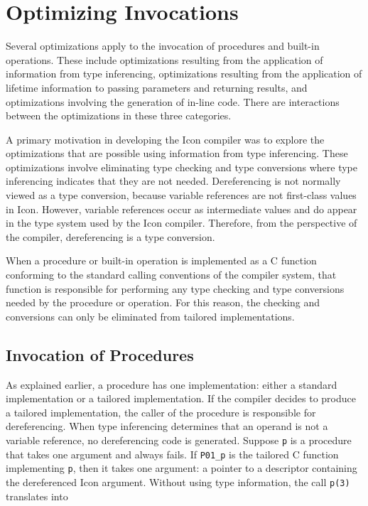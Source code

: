 \chapter{Optimizing Invocations}

Several optimizations apply to the invocation of procedures and
built-in operations. These include optimizations resulting from the
application of information from type inferencing, optimizations
resulting from the application of lifetime information to passing
parameters and returning results, and optimizations involving the
generation of in-line code. There are interactions between the
optimizations in these three categories.

A primary motivation in developing the Icon compiler was to explore
the optimizations that are possible using information from type
inferencing. These optimizations involve eliminating type checking and
type conversions where type inferencing indicates that they are not
needed. Dereferencing is not normally viewed as a type conversion,
because variable references are not first-class values in
Icon. However, variable references occur as intermediate values and do
appear in the type system used by the Icon compiler. Therefore, from
the perspective of the compiler, dereferencing is a type conversion.

When a procedure or built-in operation is implemented as a C function
conforming to the standard calling conventions of the compiler system,
that function is responsible for performing any type checking and type
conversions needed by the procedure or operation. For this reason, the
checking and conversions can only be eliminated from tailored
implementations.


\section{Invocation of Procedures}

As explained earlier, a procedure has one implementation: either a
standard implementation or a tailored implementation.  If the compiler
decides to produce a tailored implementation, the caller of the
procedure is responsible for dereferencing. When type inferencing
determines that an operand is not a variable reference, no
dereferencing code is generated. Suppose \texttt{p} is a procedure
that takes one argument and always fails. If \texttt{P01\_p} is the
tailored C function implementing \texttt{p}, then it takes one
argument: a pointer to a descriptor containing the dereferenced Icon
argument.  Without using type information, the call \texttt{p(3)}
translates into

